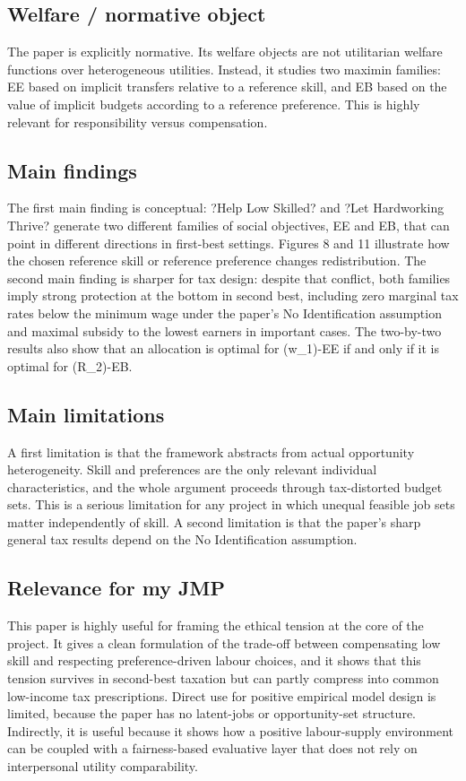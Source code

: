 \documentclass[11pt,a4paper]{article}
\begin{document}
\subsection*{Welfare / normative object}
The paper is explicitly normative. Its welfare objects are not utilitarian welfare functions over heterogeneous utilities. Instead, it studies two maximin families: EE based on implicit transfers relative to a reference skill, and EB based on the value of implicit budgets according to a reference preference. This is highly relevant for responsibility versus compensation.

\subsection*{Main findings}
The first main finding is conceptual: ?Help Low Skilled? and ?Let Hardworking Thrive? generate two different families of social objectives, EE and EB, that can point in different directions in first-best settings. Figures 8 and 11 illustrate how the chosen reference skill or reference preference changes redistribution. The second main finding is sharper for tax design: despite that conflict, both families imply strong protection at the bottom in second best, including zero marginal tax rates below the minimum wage under the paper's No Identification assumption and maximal subsidy to the lowest earners in important cases. The two-by-two results also show that an allocation is optimal for (w\_1)-EE if and only if it is optimal for (R\_2)-EB.

\subsection*{Main limitations}
A first limitation is that the framework abstracts from actual opportunity heterogeneity. Skill and preferences are the only relevant individual characteristics, and the whole argument proceeds through tax-distorted budget sets. This is a serious limitation for any project in which unequal feasible job sets matter independently of skill. A second limitation is that the paper’s sharp general tax results depend on the No Identification assumption.

\subsection*{Relevance for my JMP}
This paper is highly useful for framing the ethical tension at the core of the project. It gives a clean formulation of the trade-off between compensating low skill and respecting preference-driven labour choices, and it shows that this tension survives in second-best taxation but can partly compress into common low-income tax prescriptions. Direct use for positive empirical model design is limited, because the paper has no latent-jobs or opportunity-set structure. Indirectly, it is useful because it shows how a positive labour-supply environment can be coupled with a fairness-based evaluative layer that does not rely on interpersonal utility comparability.
\end{document}
